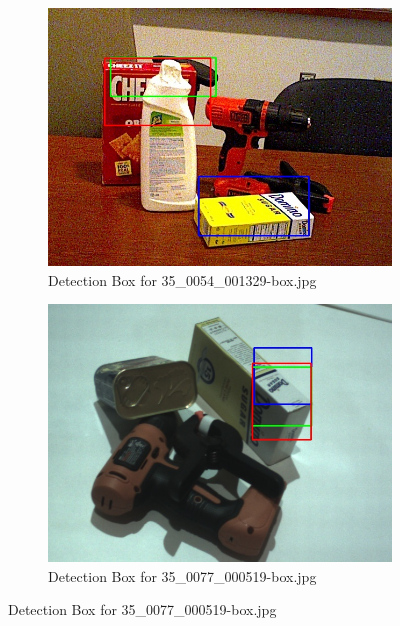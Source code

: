 \documentclass[10.5pt,a4paper]{article}
\begin{document}
\begin{figure}
    \vspace{2em} %

    \begin{subfigure}{0.45\textwidth}
        \centering
        \includegraphics[width=\textwidth]{img/35_0054_001329-box.jpg}
        \caption{Detection Box for 35\_0054\_001329-box.jpg}
        \label{fig:img29}
    \end{subfigure}
    \hfill
    \begin{subfigure}{0.45\textwidth}
        \centering
        \includegraphics[width=\textwidth]{img/35_0077_000519-box.jpg}
        \caption{Detection Box for 35\_0077\_000519-box.jpg}
        \label{fig:img30}
    \end{subfigure}
\end{figure}
\end{document}
